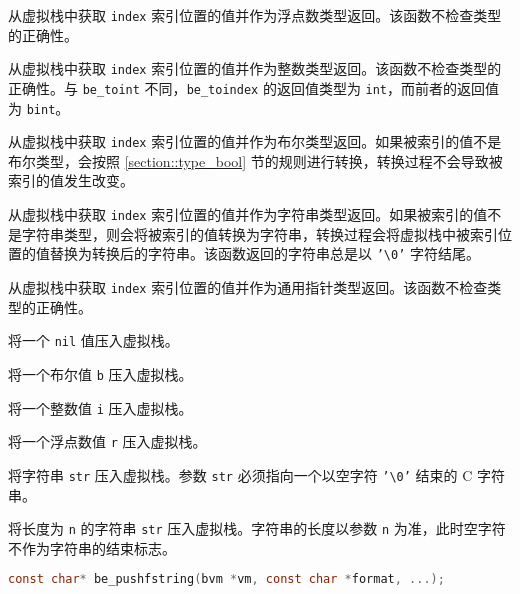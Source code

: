 
从虚拟栈中获取 \texttt{index} 索引位置的值并作为浮点数类型返回。该函数不检查类型的正确性。


从虚拟栈中获取 \texttt{index} 索引位置的值并作为整数类型返回。该函数不检查类型的正确性。与 \texttt{be\_toint} 不同，\texttt{be\_toindex} 的返回值类型为 \texttt{int}，而前者的返回值为 \texttt{bint}。


从虚拟栈中获取 \texttt{index} 索引位置的值并作为布尔类型返回。如果被索引的值不是布尔类型，会按照 \ref{section::type_bool} 节的规则进行转换，转换过程不会导致被索引的值发生改变。


从虚拟栈中获取 \texttt{index} 索引位置的值并作为字符串类型返回。如果被索引的值不是字符串类型，则会将被索引的值转换为字符串，转换过程会将虚拟栈中被索引位置的值替换为转换后的字符串。该函数返回的字符串总是以 \texttt{'\textbackslash 0'} 字符结尾。


从虚拟栈中获取 \texttt{index} 索引位置的值并作为通用指针类型返回。该函数不检查类型的正确性。


将一个 \texttt{nil} 值压入虚拟栈。


将一个布尔值 \texttt{b} 压入虚拟栈。


将一个整数值 \texttt{i} 压入虚拟栈。


将一个浮点数值 \texttt{r} 压入虚拟栈。


将字符串 \texttt{str} 压入虚拟栈。参数 \texttt{str} 必须指向一个以空字符 \texttt{'\textbackslash 0'} 结束的 C 字符串。


将长度为 \texttt{n} 的字符串 \texttt{str} 压入虚拟栈。字符串的长度以参数 \texttt{n} 为准，此时空字符不作为字符串的结束标志。


\begin{lstlisting}[language=c, style=berry, numbers=none]
const char* be_pushfstring(bvm *vm, const char *format, ...);
\end{lstlisting}

